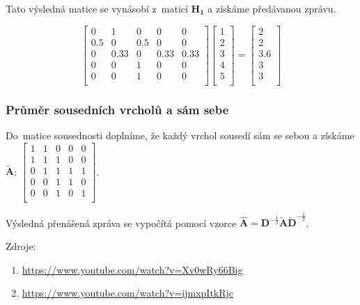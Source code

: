 Tato výsledná matice se vynásobí z~maticí $\mathbf{H_1}$ a získáme předávanou zprávu.

$$
\left[ \begin{matrix}
0 & 1 & 0 & 0 & 0 \\
0.5 & 0 & 0.5 & 0 & 0 \\
0 & 0.33 & 0 & 0.33 & 0.33 \\
0 & 0 & 1 & 0 & 0 \\
0 & 0 & 1 & 0 & 0 \\
\end{matrix} \right]
\left[ \begin{matrix}
1 \\
2 \\
3 \\
4 \\
5 \\
\end{matrix} \right] = 
\left[ \begin{matrix}
2 \\
2 \\
3.6 \\
3 \\
3 \\
\end{matrix} \right] 
$$

\subsubsection{Průměr sousedních vrcholů a sám sebe}

Do~matice sousednosti doplníme, že každý vrchol sousedí sám se sebou a získáme $\mathbf{\tilde{A}}$:
$\left[ \begin{matrix}
1 & 1 & 0 & 0 & 0 \\
1 & 1 & 1 & 0 & 0 \\
0 & 1 & 1 & 1 & 1 \\
0 & 0 & 1 & 1 & 0 \\
0 & 0 & 1 & 0 & 1 \\
\end{matrix} \right]$.

Výsledná přenášená zpráva se vypočítá pomocí vzorce
$\mathbf{\hat{A}} = \mathbf{D}^{-\frac{1}{2}}\mathbf{\tilde{A}}\mathbf{\tilde{D}}^{-\frac{1}{2}}$.

Zdroje:
\begin{enumerate}
    \item \url{https://www.youtube.com/watch?v=Xv0wRy66Big}
    \item \url{https://www.youtube.com/watch?v=ijmxpItkRjc}
\end{enumerate}

